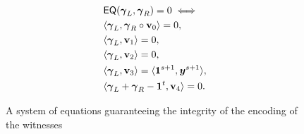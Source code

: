 \begin{figure}
  \begin{align}
    &
    \textsf{EQ}({\boldsymbol{\gamma}}_L, {\boldsymbol{\gamma}}_R) = 0 \iff \nonumber\\
    &
    \langle {\boldsymbol{\gamma}}_L, {\boldsymbol{\gamma}}_R  \circ \textbf{v}_0 \rangle = 0 \label{ceq0},\\
    &
    \langle {\boldsymbol{\gamma}}_L , \textbf{v}_{1} \rangle = 0 \label{ceq1},\\
    &
    \langle {\boldsymbol{\gamma}}_L, \textbf{v}_2 \rangle = 0 \label{ceq2},\\
    &
    \langle {\boldsymbol{\gamma}}_L, \textbf{v}_3 \rangle = \langle {\boldsymbol{1}}^{s+1}, {\boldsymbol{y}}^{s+1} \rangle \label{ceq3}, \\
    &
    \langle {\boldsymbol{\gamma}}_L + {\boldsymbol{\gamma}}_R - {\boldsymbol{1}}^{t}, \textbf{v}_{4} \rangle = 0 \label{ceq4}.
\end{align}
\caption{A system of equations guaranteeing the integrity of the encoding of the witnesses}
\label{fig:syseqn}
\end{figure}

  


  
  
  
  
